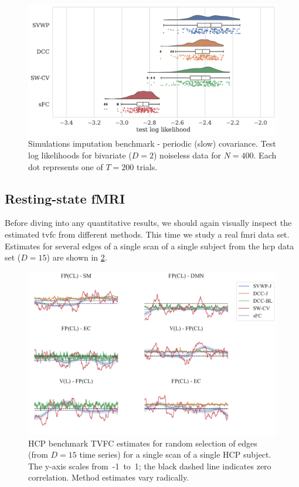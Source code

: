 \begin{figure}[t]
  \centering
  \includegraphics[width=\textwidth]{fig/sim/d2/N0400_T0200/imputation_study/LEOO_no_noise_test_log_likelihoods_raincloud_periodic_1}
  \caption{
    Simulations imputation benchmark - periodic (slow) covariance.
    Test log likelihoods for bivariate ($D = 2$) noiseless data for $N = 400$.
    Each dot represents one of $T = 200$ trials.
  }\label{fig:sim-imputation-study-d2-periodic-1}
\end{figure}


\clearpage
\subsection{Resting-state fMRI}\label{subsec:hcp-results}

Before diving into any quantitative results, we should again visually inspect the estimated \gls{tvfc} from different methods.
This time we study a real \gls{fmri} data set.
Estimates for several edges of a single scan of a single subject from the \gls{hcp} data set ($D = 15$) are shown in \cref{fig:hcp-model-estimates-example}.


\begin{figure}[ht]
  \centering
  \includegraphics[width=\textwidth]{fig/hcp/d15/TVFC_predictions/scan_0/all/100206/correlation_estimates_random_edges}
  \caption{
    HCP benchmark TVFC estimates for random selection of edges (from $D = 15$ time series) for a single scan of a single HCP subject.
    The y-axis scales from~-1~to~1; the black dashed line indicates zero correlation.
    Method estimates vary radically.
}\label{fig:hcp-model-estimates-example}
\end{figure}


